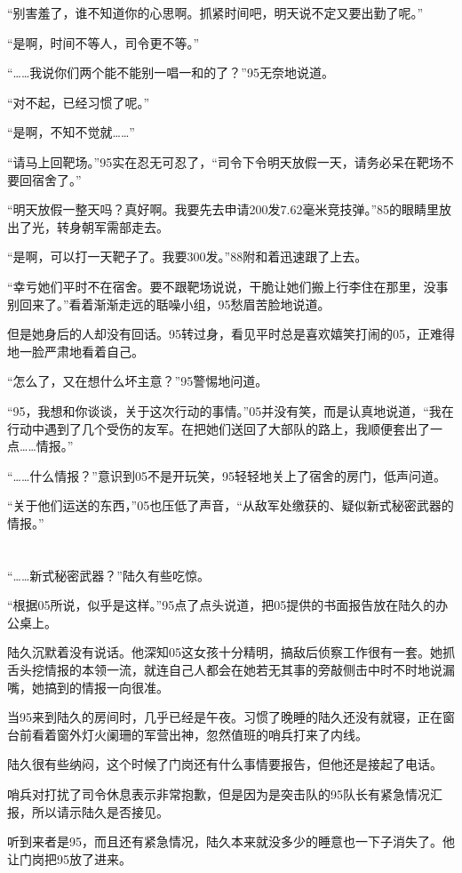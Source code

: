 “别害羞了，谁不知道你的心思啊。抓紧时间吧，明天说不定又要出勤了呢。”

“是啊，时间不等人，司令更不等。”

“……我说你们两个能不能别一唱一和的了？”95无奈地说道。

“对不起，已经习惯了呢。”

“是啊，不知不觉就……”

“请马上回靶场。”95实在忍无可忍了，“司令下令明天放假一天，请务必呆在靶场不要回宿舍了。”

“明天放假一整天吗？真好啊。我要先去申请200发7.62毫米竞技弹。”85的眼睛里放出了光，转身朝军需部走去。

“是啊，可以打一天靶子了。我要300发。”88附和着迅速跟了上去。

“幸亏她们平时不在宿舍。要不跟靶场说说，干脆让她们搬上行李住在那里，没事别回来了。”看着渐渐走远的聒噪小组，95愁眉苦脸地说道。

但是她身后的人却没有回话。95转过身，看见平时总是喜欢嬉笑打闹的05，正难得地一脸严肃地看着自己。

“怎么了，又在想什么坏主意？”95警惕地问道。

“95，我想和你谈谈，关于这次行动的事情。”05并没有笑，而是认真地说道，“我在行动中遇到了几个受伤的友军。在把她们送回了大部队的路上，我顺便套出了一点……情报。”

“……什么情报？”意识到05不是开玩笑，95轻轻地关上了宿舍的房门，低声问道。

“关于他们运送的东西，”05也压低了声音，“从敌军处缴获的、疑似新式秘密武器的情报。”
\section*{}

“……新式秘密武器？”陆久有些吃惊。

“根据05所说，似乎是这样。”95点了点头说道，把05提供的书面报告放在陆久的办公桌上。

陆久沉默着没有说话。他深知05这女孩十分精明，搞敌后侦察工作很有一套。她抓舌头挖情报的本领一流，就连自己人都会在她若无其事的旁敲侧击中时不时地说漏嘴，她搞到的情报一向很准。

当95来到陆久的房间时，几乎已经是午夜。习惯了晚睡的陆久还没有就寝，正在窗台前看着窗外灯火阑珊的军营出神，忽然值班的哨兵打来了内线。

陆久很有些纳闷，这个时候了门岗还有什么事情要报告，但他还是接起了电话。

哨兵对打扰了司令休息表示非常抱歉，但是因为是突击队的95队长有紧急情况汇报，所以请示陆久是否接见。

听到来者是95，而且还有紧急情况，陆久本来就没多少的睡意也一下子消失了。他让门岗把95放了进来。

